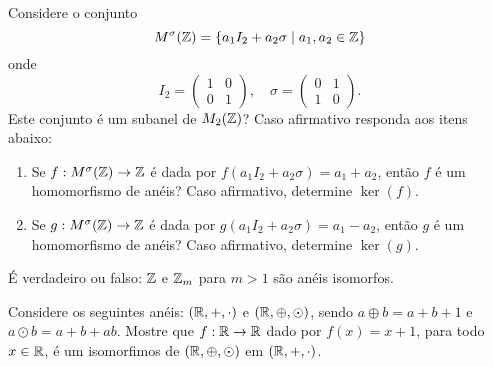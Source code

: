 \documentclass[12pt]{exam}
\begin{document}
    \vspace{.3cm}

    \questao{} Considere o conjunto
    \[
        M^\sigma(\mathbb{Z}) = \{a_1I_2 + a_2\sigma \mid a_1, a_2 \in \mathbb{Z}\}
    \]
    onde
    \[
        I_2 = \begin{pmatrix} 1 & 0\\ 0 & 1\end{pmatrix}, \quad \sigma = \begin{pmatrix} 0 & 1\\ 1 & 0\end{pmatrix}.
    \]
    Este conjunto é um subanel de $M_2(\mathbb{Z})$? Caso afirmativo responda aos itens abaixo:
    \begin{enumerate}[label=({\alph*})]
        \item Se $f : M^\sigma(\mathbb{Z}) \to \mathbb{Z}$ é dada por $f(a_1I_2 + a_2\sigma) = a_1 + a_2$, então $f$ é um homomorfismo de anéis? Caso afirmativo, determine $\ker(f)$.

        \item Se $g : M^\sigma(\mathbb{Z}) \to \mathbb{Z}$ é dada por $g(a_1I_2 + a_2\sigma) = a_1 - a_2$, então $g$ é um homomorfismo de anéis? Caso afirmativo, determine $\ker(g)$.
    \end{enumerate}

    \vspace{.3cm}

    \questao{} {\'E} verdadeiro ou falso: $\mathbb{Z}$ e $\mathbb{Z}_{m}$ para $m > 1$ s{\~a}o an{\'e}is
    isomorfos.

    \vspace{.3cm}

    \questao{} Considere os seguintes an{\'e}is: $(\mathbb{R}, +, \cdot)$ e $(\mathbb{R}, \oplus, \odot)$, sendo $a \oplus b = a + b + 1$ e $a \odot b = a + b + ab$. Mostre que $f : \mathbb{R} \to \mathbb{R}$ dado por $f(x) = x + 1$, para todo $x \in \mathbb{R}$, {\'e} um isomorfimos de $(\mathbb{R}, \oplus, \odot)$ em $(\mathbb{R}, +, \cdot)$.

    \vspace{.3cm}




\end{document}
